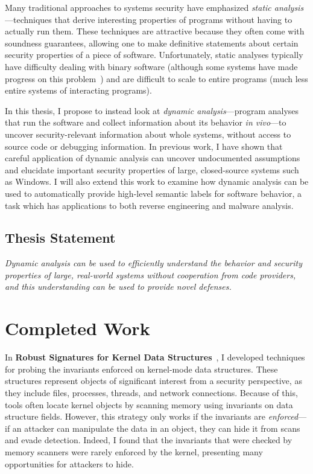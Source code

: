 \documentclass{article}
\begin{document}
Many traditional approaches to systems security have emphasized
\emph{static analysis}---techniques that derive interesting properties
of programs without having to actually run them. These techniques are
attractive because they often come with soundness guarantees, allowing
one to make definitive statements about certain security properties of a
piece of software. Unfortunately, static analyses typically have
difficulty dealing with binary software (although some systems have made
progress on this problem~\cite{song:2008:bitblaze,Brumley:2011:bap}) and
are difficult to scale to entire programs (much less entire systems of
interacting programs).

In this thesis, I propose to instead look at \emph{dynamic
analysis}---program analyses that run the software and collect
information about its behavior \emph{in vivo}---to uncover
security-relevant information about whole systems, without access to
source code or debugging information. In previous work, I have shown
that careful application of dynamic analysis can uncover undocumented
assumptions and elucidate important security properties of large,
closed-source systems such as Windows. I will also extend this work to
examine how dynamic analysis can be used to automatically provide
high-level semantic labels for software behavior, a task which has
applications to both reverse engineering and malware analysis.

\subsection{Thesis Statement}

\emph{Dynamic analysis can be used to efficiently understand the
    behavior and security properties of large, real-world systems
    without cooperation from code providers, and this understanding can
    be used to provide novel defenses.}

\section {Completed Work}

In \textbf{Robust Signatures for Kernel Data
Structures}~\cite{dolangavitt2009dssig}, I developed techniques for
probing the invariants enforced on kernel-mode data structures. These
structures represent objects of significant interest from a security
perspective, as they include files, processes, threads, and network
connections. Because of this, tools often locate kernel objects by
scanning memory using invariants on data structure fields. However, this
strategy only works if the invariants are \emph{enforced}---if an
attacker can manipulate the data in an object, they can hide it from
scans and evade detection. Indeed, I found that the invariants that
were checked by memory scanners were rarely enforced by the kernel,
presenting many opportunities for attackers to hide.
\end{document}
